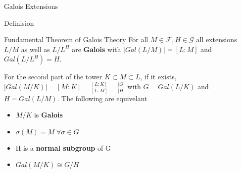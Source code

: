 \documentclass[12pt, letterpaper]{article}
\begin{document}
\begin{section}{Galois Extensions}
\begin{subsection}{Definision}
\begin{subsubsection}{Fundamental Theorem of Galois Theory}
      For all \(M \in \mathcal{F}, H \in \mathcal{G}\) all extensions \(L / M\) as
      well as \(L / L^{H}\) are \textbf{Galois} with \(| Gal(L / M) | = [L : M]\)
      and \(Gal(L / L^{H}) = H\).

      For the second part of the tower \(K \subset M \subset L\), if it exists,
      \(| Gal(M / K) | = [M : K] = \frac{[L : K]}{[L : M]} = \frac{| G |}{| H |
      }\) with \(G = Gal(L / K)\) and \(H = Gal(L / M)\).
      The following are equivelant
      \begin{itemize}
        \item \(M / K\) is \textbf{Galois}
        \item \(\sigma(M) = M \; \forall \sigma \in G\)
        \item H is a \textbf{normal subgroup} of G
        \item \(Gal(M / K) \cong G / H\)
      \end{itemize}

    \end{subsubsection}

  \end{subsection}

\end{section}
\end{document}
